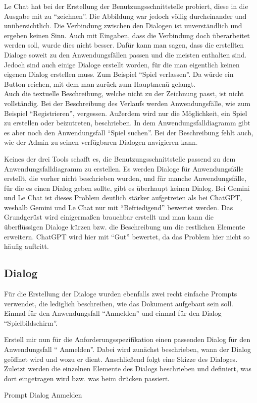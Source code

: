 Le Chat hat bei der Erstellung der Benutzungsschnittstelle probiert, diese in die Ausgabe mit zu ``zeichnen''. Die Abbildung war jedoch 
völlig durcheinander und unübersichtlich. Die Verbindung zwischen den Dialogen ist unverständlich und ergeben keinen Sinn. Auch mit 
Eingaben, dass die Verbindung doch überarbeitet werden soll, wurde dies nicht besser. Dafür kann man sagen, dass die erstellten Dialoge 
soweit zu den Anwendungsfällen passen und die meisten enthalten sind. Jedoch sind auch einige Dialoge erstellt worden, für die man 
eigentlich keinen eigenen Dialog erstellen muss. Zum Beispiel ``Spiel verlassen''. Da würde ein Button reichen, mit dem man zurück zum 
Hauptmenü gelangt.\\
Auch die textuelle Beschreibung, welche nicht zu der Zeichnung passt, ist nicht vollständig. Bei der Beschreibung des Verlaufs werden 
Anwendungsfälle, wie zum Beispiel ``Registrieren'', vergessen. Außerdem wird nur die Möglichkeit, ein Spiel zu erstellen oder beizutreten, 
beschrieben. In dem Anwendungsfalldiagramm gibt es aber noch den Anwendungsfall ``Spiel suchen''. Bei der Beschreibung fehlt auch, wie der 
Admin zu seinen verfügbaren Dialogen navigieren kann.

Keines der drei Tools schafft es, die Benutzungsschnittstelle passend zu dem Anwendungsfalldiagramm zu erstellen. Es werden Dialoge für 
Anwendungsfälle erstellt, die vorher nicht beschrieben wurden, und für manche Anwendungsfälle, für die es einen Dialog geben sollte, gibt 
es überhaupt keinen Dialog. Bei Gemini und Le Chat ist dieses Problem deutlich stärker aufgetreten als bei ChatGPT, weshalb Gemini und 
Le Chat nur mit ``Befriedigend'' bewertet werden. Das Grundgerüst wird einigermaßen brauchbar erstellt und man kann die überflüssigen Dialoge 
kürzen bzw. die Beschreibung um die restlichen Elemente erweitern. ChatGPT wird hier mit ``Gut'' bewertet, da das Problem hier nicht so 
häufig auftritt.

\subsection*{Dialog}

Für die Erstellung der Dialoge wurden ebenfalls zwei recht einfache Prompts verwendet, die lediglich beschreiben, wie das Dokument aufgebaut 
sein soll. Einmal für den Anwendungsfall ``Anmelden'' und einmal für den Dialog ``Spielbildschirm''.

\begin{prompt}[H]
    \begin{tcolorbox}[colback=gray!20, colframe=gray!20, boxrule=0pt, sharp corners] 
        Erstell mir nun für die Anforderungsspezifikation einen passenden Dialog für den Anwendungsfall ``
    Anmelden''. Dabei wird zunächst 
        beschrieben, wann der Dialog geöffnet wird und wozu er dient. Anschließend folgt eine Skizze des Dialoges. Zuletzt werden die 
        einzelnen Elemente des Dialogs beschrieben und definiert, was dort eingetragen wird bzw. was beim drücken passiert.
        \vfill
    \end{tcolorbox}
    \caption{Prompt Dialog Anmelden}
    \label{Prompt Dialog Anmelden}
\end{prompt}

